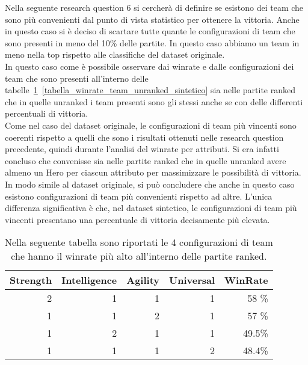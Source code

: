 Nella seguente research question 6 si cercherà di definire se esistono dei team che sono più convenienti dal punto di vista statistico per ottenere la vittoria. Anche in questo caso si è deciso di scartare tutte quante le configurazioni di team che sono presenti in meno del 10\% delle partite. In questo caso abbiamo un team in meno nella top rispetto alle classifiche del dataset originale. \\
In questo caso come è possibile osservare dai winrate e dalle configurazioni dei team che sono presenti all'interno delle tabelle~\ref{tabella_winrate_team_ranked_sintetico}~\ref{tabella_winrate_team_unranked_sintetico} sia nelle partite ranked che in quelle unranked i team presenti sono gli stessi anche se con delle differenti percentuali di vittoria. \\
Come nel caso del dataset originale, le configurazioni di team più vincenti sono coerenti rispetto a quelli che sono i risultati ottenuti nelle research question precedente, quindi durante l'analisi del winrate per attributi. Si era infatti concluso che convenisse sia nelle partite ranked che in quelle unranked avere almeno un Hero per ciascun attributo per massimizzare le possibilità di vittoria. \\
In modo simile al dataset originale, si può concludere che anche in questo caso esistono configurazioni di team più convenienti rispetto ad altre. L’unica differenza significativa è che, nel dataset sintetico, le configurazioni di team più vincenti presentano una percentuale di vittoria decisamente più elevata.
\begin{table}[htbp]
\centering
\caption{Nella seguente tabella sono riportati le 4 configurazioni di team che hanno il winrate più alto all'interno delle partite ranked. }
\label{tabella_winrate_team_ranked_sintetico}
\begin{tabular}{|r|r|r|r|r|}
\hline
\multicolumn{1}{|l|}{Strength} & \multicolumn{1}{l|}{Intelligence} & \multicolumn{1}{l|}{Agility} & \multicolumn{1}{l|}{Universal} & \multicolumn{1}{l|}{WinRate} \\ \hline
2 & 1 & 1 & 1 &   58  \% \\ \hline
1 & 1 & 2 & 1 &   57  \% \\ \hline
1 & 2 & 1 & 1 &   49.5\%  \\ \hline
1 & 1 & 1 & 2 &   48.4\%  \\ \hline
\end{tabular}
\end{table}
